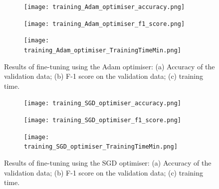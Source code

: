 \documentclass[a4paper,12pt]{article}
\newcommand{\figwidthh}{0.48\textwidth}
\begin{document}
\begin{figure}[tbp] 
	\begin{center}
		\begin{subfigure}[b]{\figwidthh}
			\caption{} 
			\texttt{[image: training\_Adam\_optimiser\_accuracy.png]}
		\end{subfigure}
        \hfill
		\begin{subfigure}[b]{\figwidthh}
			\caption{}
			\texttt{[image: training\_Adam\_optimiser\_f1\_score.png]}
		\end{subfigure}
        \hfill
		\begin{subfigure}[b]{\figwidthh}
			\caption{}
			\texttt{[image: training\_Adam\_optimiser\_TrainingTimeMin.png]}
		\end{subfigure}
	\end{center}
	\caption{Results of fine-tuning using the Adam optimiser: (a) Accuracy of the validation data; (b) F-1 score on the validation data; (c) training time. 
	} 
	\label{fig:res_training_adam}
\end{figure}

\begin{figure}[tbp] 
	\begin{center}
		\begin{subfigure}[b]{\figwidthh}
			\caption{} 
			\texttt{[image: training\_SGD\_optimiser\_accuracy.png]}
		\end{subfigure}
        \hfill
		\begin{subfigure}[b]{\figwidthh}
			\caption{}
			\texttt{[image: training\_SGD\_optimiser\_f1\_score.png]}
		\end{subfigure}
        \hfill
		\begin{subfigure}[b]{\figwidthh}
			\caption{}
			\texttt{[image: training\_SGD\_optimiser\_TrainingTimeMin.png]}
		\end{subfigure}
	\end{center}
	\caption{Results of fine-tuning using the SGD optimiser: (a) Accuracy of the validation data; (b) F-1 score on the validation data; (c) training time. 
	} 
	\label{fig:res_training_SGD}
\end{figure}





    


\clearpage

\newpage

\end{document}

